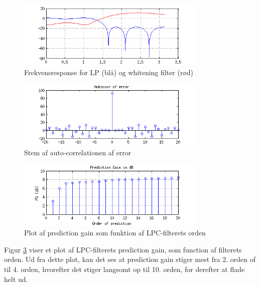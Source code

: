 \begin{figure}[!ht]
	\centering
	\includegraphics[width=0.8\textwidth]{resources/part3_lp_and_whitening_filter}
 	\caption{Frekvensresponse for LP (blå) og whitening filter (rød)}
 	\label{fig:part3_5}
\end{figure}

\begin{figure}[!ht]
	\centering
	\includegraphics[width=0.8\textwidth]{resources/part3_error_xcorr}
 	\caption{Stem af auto-correlationen af error}
 	\label{fig:part3_6}
\end{figure}

\begin{figure}[!ht]
	\centering
	\includegraphics[width=0.8\textwidth]{resources/part3_pg_as_function_of_order}
 	\caption{Plot af prediction gain som funktion af LPC-filterets orden}
 	\label{fig:part3_7}
\end{figure}

Figur \ref{fig:part3_7} viser et plot af LPC-filterets prediction gain, som function af filterets orden. Ud fra dette plot, kan det ses at prediction gain stiger mest fra 2. orden of til 4. orden, hvorefter det stiger langsomt op til 10. orden, for derefter at flade helt ud.


